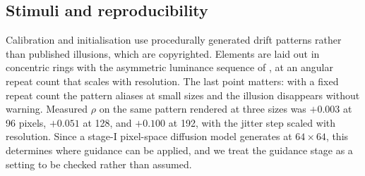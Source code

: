 \subsection{Stimuli and reproducibility}

Calibration and initialisation use procedurally generated drift patterns rather
than published illusions, which are copyrighted. Elements are laid out in
concentric rings with the asymmetric luminance sequence of
\citet{kitaoka2003snakes}, at an angular repeat count that scales with
resolution. The last point matters: with a fixed repeat count the pattern
aliases at small sizes and the illusion disappears without warning. Measured
$\rho$ on the same pattern rendered at three sizes was $+0.003$ at 96 pixels,
$+0.051$ at 128, and $+0.100$ at 192, with the jitter step scaled with
resolution. Since a stage-I pixel-space diffusion
model generates at $64\times64$, this determines where guidance can be applied,
and we treat the guidance stage as a setting to be checked rather than assumed.





